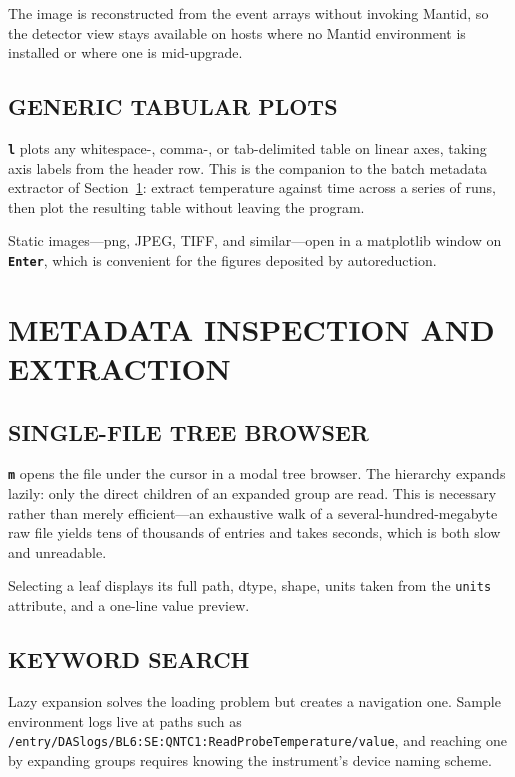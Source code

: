 \documentclass[tm]{ornltm}
\newcommand{\key}[1]{\textbf{\texttt{#1}}}
\begin{document}
The image is reconstructed from the event arrays without invoking Mantid, so the
detector view stays available on hosts where no Mantid environment is installed
or where one is mid-upgrade.

\subsection{GENERIC TABULAR PLOTS}

\key{l} plots any whitespace-, comma-, or tab-delimited table on linear axes,
taking axis labels from the header row. This is the companion to the batch
metadata extractor of Section~\ref{sec:meta}: extract temperature against time
across a series of runs, then plot the resulting table without leaving the
program.

Static images---\ac{png}, JPEG, TIFF, and similar---open in a matplotlib window
on \key{Enter}, which is convenient for the figures deposited by autoreduction.

\section{METADATA INSPECTION AND EXTRACTION}
\label{sec:meta}

\subsection{SINGLE-FILE TREE BROWSER}

\key{m} opens the file under the cursor in a modal tree browser. The hierarchy
expands lazily: only the direct children of an expanded group are read. This is
necessary rather than merely efficient---an exhaustive walk of a
several-hundred-megabyte raw file yields tens of thousands of entries and takes
seconds, which is both slow and unreadable.

Selecting a leaf displays its full path, dtype, shape, units taken from the
\texttt{units} attribute, and a one-line value preview.

\subsection{KEYWORD SEARCH}
\label{sec:hdfsearch}

Lazy expansion solves the loading problem but creates a navigation one. Sample
environment logs live at paths such as
\texttt{/entry/DASlogs/BL6:SE:QNTC1:ReadProbeTemperature/value}, and reaching one
by expanding groups requires knowing the instrument's device naming scheme.
\end{document}
